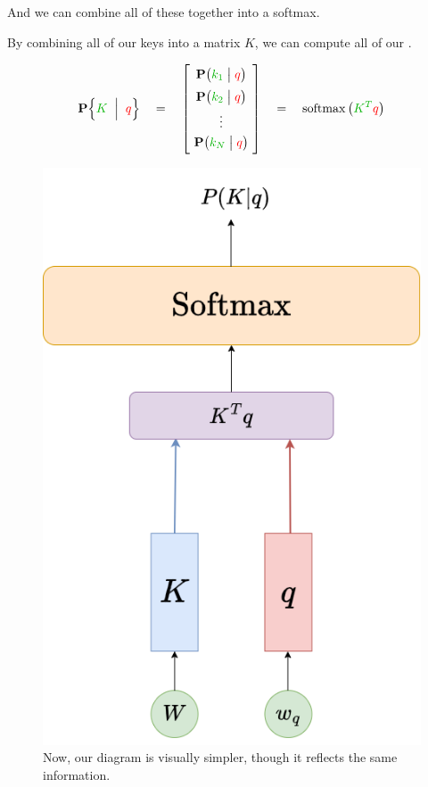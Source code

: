         And we can combine all of these together into a softmax.\\

        \begin{kequation}
            By combining all of our keys into a matrix $K$, we can compute all of our  .

            \begin{equation*}
                \given{ \grn{K} }{ \red{q} }  \quad=\quad
                \begin{bmatrix}
                    \phantom{\Big|} 
                    \mathbf{P} \big( \grn{k_1} \;\big|\; \red{q} \big) \phantom{\Big|} \\
                    \phantom{\Big|}
                    \mathbf{P} \big( \grn{k_2} \;\big|\; \red{q} \big) 
                    \phantom{\Big|}\\
                    \vdots \\
                    \phantom{\Big|}
                    \mathbf{P} \big( \grn{k_N} \;\big|\; \red{q} \big) 
                    \phantom{\Big|}\\
                \end{bmatrix}
                \quad=\quad
                \operatorname{softmax} \big( \grn{K^T}\red{q} \big)
            \end{equation*}
        \end{kequation}


        \begin{figure}[H]
            \centering
            \includegraphics[width=0.3\linewidth]{images/transformers_images/condensed_attention_weights.png}
            \caption*{Now, our diagram is visually simpler, though it reflects the same information.}
        \end{figure}

        




